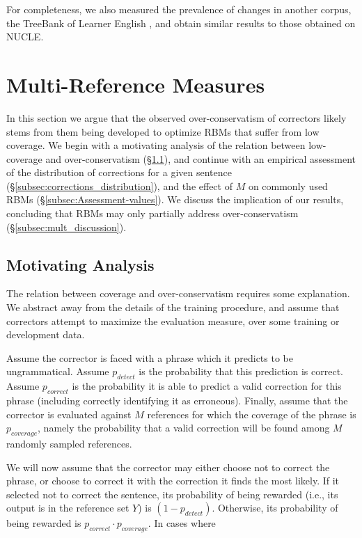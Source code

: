 \documentclass[letter,11pt]{article}
\begin{document}
For completeness, we also measured the prevalence of changes in
another corpus, the TreeBank of Learner English \cite{yannakoudakis2011new},
and obtain  similar results to those obtained on NUCLE.
%
%
\section{Multi-Reference Measures}\label{sec:increase-reference}
%
In this section we argue that the observed over-conservatism of correctors likely stems
from them being developed to optimize RBMs that suffer from low coverage.
We begin with a motivating analysis of the relation between low-coverage and over-conservatism (\S \ref{subsec:motivating_analysis}),
and continue with an empirical assessment of the distribution of corrections for a given sentence (\S \ref{subsec:corrections_distribution}),
and the effect of $M$ on commonly used RBMs (\S \ref{subsec:Assessment-values}).
We discuss the implication of our results, concluding that RBMs may only partially address over-conservatism (\S \ref{subsec:mult_discussion}).
%
\subsection{Motivating Analysis}\label{subsec:motivating_analysis}
%
The relation between coverage and over-conservatism requires some explanation.
We abstract away from the details of the training procedure, and assume that correctors attempt to maximize the evaluation measure, over some training or development data.

Assume the corrector is faced with a phrase which it predicts to be ungrammatical. Assume $p_{detect}$ is the probability that this prediction is correct.
Assume $p_{correct}$ is the probability it is able to predict
a valid correction for this phrase (including correctly identifying it as erroneous).
Finally, assume that the corrector is evaluated
against $M$ references for which the coverage of the phrase is $p_{coverage}$,
namely the probability that
a valid correction will be found among $M$ randomly sampled references.

We will now assume that the corrector may either choose not to correct the phrase,
or choose to correct it with the correction it finds the most likely. If it selected not to correct the sentence, its probability of being rewarded (i.e., its output is in the reference set $Y$) is $(1-p_{detect})$. Otherwise, its probability
of being rewarded is $p_{correct} \cdot p_{coverage}$.
In cases where
\end{document}
